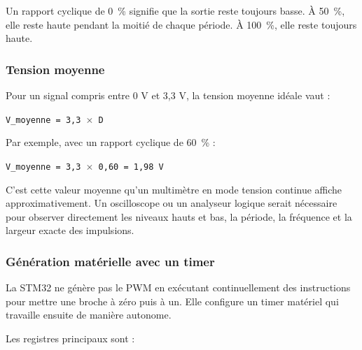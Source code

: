 \documentclass[11pt,a4paper]{article}
\begin{document}
	Un rapport cyclique de 0~\% signifie que la sortie reste toujours basse. À 50~\%, elle reste haute pendant la moitié de chaque période. À 100~\%, elle reste toujours haute.
	
	\subsubsection*{Tension moyenne}
	
	Pour un signal compris entre 0 V et 3,3 V, la tension moyenne idéale vaut :
	
	\begin{center}
		\texttt{V\_moyenne = 3,3 $\times$ D}
	\end{center}
	
	Par exemple, avec un rapport cyclique de 60~\% :
	
	\begin{center}
		\texttt{V\_moyenne = 3,3 $\times$ 0,60 = 1,98 V}
	\end{center}
	
	C'est cette valeur moyenne qu'un multimètre en mode tension continue affiche approximativement. Un oscilloscope ou un analyseur logique serait nécessaire pour observer directement les niveaux hauts et bas, la période, la fréquence et la largeur exacte des impulsions.
	
	\subsubsection*{Génération matérielle avec un timer}
	
	La STM32 ne génère pas le PWM en exécutant continuellement des instructions pour mettre une broche à zéro puis à un. Elle configure un timer matériel qui travaille ensuite de manière autonome.
	
	\begin{center}
	\end{center}
	
	Les registres principaux sont :
	
\end{document}
